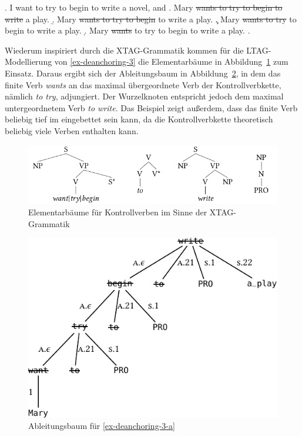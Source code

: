 \ex. \label{ex-deanchoring-3} I want to try to begin to write a novel, and
\a. Mary \sout{wants to try to begin to write} a play.\label{ex-deanchoring-3-a}
\b. Mary \sout{wants to try to begin} to write a play.\label{ex-ross-70-b}
\c. Mary \sout{wants to try} to begin to write a play.\label{ex-ross-70-c}
\d. Mary \sout{wants} to try to begin to write a play.\label{ex-ross-70-d}
\z. \citep[(2-c)]{Ross:70}

Wiederum inspiriert durch die XTAG-Grammatik kommen für die LTAG-Model\-lie\-rung von \ref{ex-deanchoring-3} die Elementarbäume in Abbildung~\ref{fig-deanchoring-4} zum Einsatz. Daraus ergibt sich der Ableitungsbaum in Abbildung~\ref{fig-deanchoring-5}, in dem das finite Verb {\it wants} an das maximal übergeordnete Verb der Kontrollverbkette, nämlich {\it to try}, adjungiert. Der Wurzelknoten entspricht jedoch dem maximal untergeordnetem Verb {\it to write}. Das Beispiel zeigt au\ss erdem, dass das finite Verb beliebig tief im  eingebettet sein kann, da die Kontrollverbkette theoretisch beliebig viele Verben enthalten kann.

\begin{figure}[t]
\centering
\includegraphics{graphics/abb817.pdf}
\caption{\label{fig-deanchoring-4}Elementarbäume für Kontrollverben im Sinne der XTAG-Grammatik \citep[Figure~5]{Lichte:Kallmeyer:10}}
\end{figure}

\begin{figure}[t]
\centering
\includegraphics{graphics/abb818.pdf}
\caption{\label{fig-deanchoring-5}Ableitungsbaum für \ref{ex-deanchoring-3-a} \citep[Figure~6]{Lichte:Kallmeyer:10}}
\end{figure}

